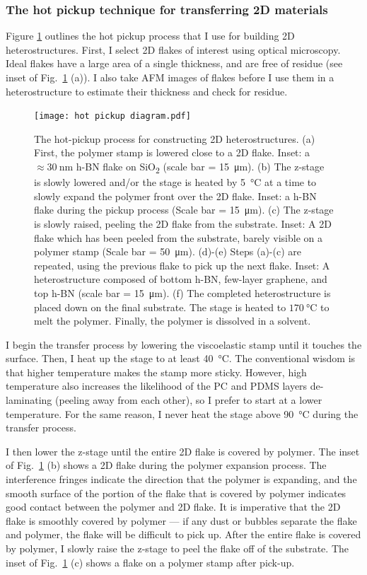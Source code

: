 \documentclass[double,12pt,1in,seploa]{beavtex}
\let\Oldsubsubsection\subsubsection
\renewcommand{\subsubsection}{\FloatBarrier\Oldsubsubsection}
\begin{document}
\subsubsection{The hot pickup technique for transferring 2D materials} \label{the hot pickup proces}
Figure \ref{hot pickup diagram} outlines the hot pickup process that I use for building 2D heterostructures. First, I select 2D flakes of interest using optical microscopy. Ideal flakes have a large area of a single thickness, and are free of residue (see inset of Fig.\ \ref{hot pickup diagram} (a)). I also take AFM images of flakes before I use them in a heterostructure to estimate their thickness and check for residue. 

\begin{figure}
    \texttt{[image: hot pickup diagram.pdf]}
    \caption{The hot-pickup process for constructing 2D heterostructures. (a) First, the polymer stamp is lowered close to a 2D flake. Inset: a $\approx \SI{30}{\nano\meter}$ h-BN flake on SiO\textsubscript{2} (scale bar = \SI{15}{\micro\meter}). (b) The z-stage is slowly lowered and/or the stage is heated by \SI{5}{\celsius} at a time to slowly expand the polymer front over the 2D flake. Inset: a h-BN flake during the pickup process (Scale bar = \SI{15}{\micro\meter}). (c) The z-stage is slowly raised, peeling the 2D flake from the substrate. Inset: A 2D flake which has been peeled from the substrate, barely visible on a polymer stamp (Scale bar = \SI{50}{\micro\meter}). (d)-(e) Steps (a)-(c) are repeated, using the previous flake to pick up the next flake. Inset: A heterostructure composed of bottom h-BN, few-layer graphene, and top h-BN (scale bar = \SI{15}{\micro\meter}). (f) The completed heterostructure is placed down on the final substrate. The stage is heated to $\SI{170}{\celsius}$ to melt the polymer. Finally, the polymer is dissolved in a solvent.}
    \label{hot pickup diagram}
\end{figure}

I begin the transfer process by lowering the viscoelastic stamp until it touches the surface. Then, I heat up the stage to at least \SI{40}{\celsius}. The conventional wisdom is that higher temperature makes the stamp more sticky. However, high temperature also increases the likelihood of the PC and PDMS layers de-laminating (peeling away from each other), so I prefer to start at a lower temperature. For the same reason, I never heat the stage above \SI{90}{\celsius} during the transfer process. 

I then lower the z-stage until the entire 2D flake is covered by polymer. The inset of Fig.\ \ref{hot pickup diagram} (b) shows a 2D flake during the polymer expansion process. The interference fringes indicate the direction that the polymer is expanding, and the smooth surface of the portion of the flake that is covered by polymer indicates good contact between the polymer and 2D flake. It is imperative that the 2D flake is smoothly covered by polymer — if any dust or bubbles separate the flake and polymer, the flake will be difficult to pick up. After the entire flake is covered by polymer, I slowly raise the z-stage to peel the flake off of the substrate. The inset of Fig.\ \ref{hot pickup diagram} (c) shows a flake on a polymer stamp after pick-up.
\end{document}
